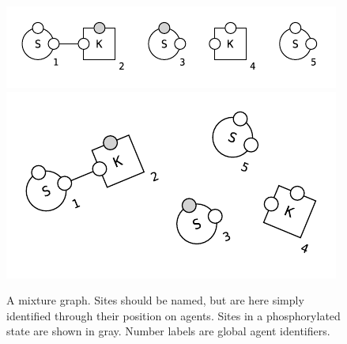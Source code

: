 \begin{figure}[!h]
  \vskip -0.25cm
  \begin{center}
    \ifshort
    \includegraphics[scale=1.0]{figures/mixture-linear.pdf}
    \else
    \includegraphics[scale=0.9]{figures/mixture.pdf}
    \fi
  \end{center}
  \vskip -0.5cm
  \caption{A mixture graph. Sites should be named, but are here simply
    identified through their position on agents.  Sites in a
    phosphorylated state are shown in gray. Number labels are global
    agent identifiers.}
  \label{fig:mixture}
\end{figure}